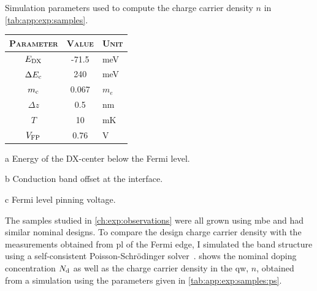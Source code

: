 \begin{margintable}
    \centering
    \footnotesize
    \begin{threeparttable}
        \caption{
            Simulation parameters used to compute the charge carrier density $n$ in \cref{tab:app:exp:samples}.
        }
        \label{tab:app:exp:samples:ps}
        \begin{tabularx}{\marginparwidth}{c S l}
            \toprule
            \textsc{Parameter}              & {\textsc{Value}}  & \textsc{Unit} \\
            \midrule
            $E_{\mathrm{DX}}$          & -71.5             & \unit{meV} \\
            $\Delta E_{\mathrm{c}}$    & 240               & \unit{meV} \\
            $m_{\mathrm{c}}$                    & 0.067             & $m_e$ \\
            $\Delta z$                      & 0.5               & \unit{nm} \\
            $T$                             & 10                & \unit{mK} \\
            $V_{\mathrm{FP}}$          & 0.76              & \unit{V} \\
            \bottomrule
        \end{tabularx}
        \begin{tablenotes}
            \scriptsize
            \item[a] Energy of the DX-center below the Fermi level.
            \item[b] Conduction band offset at the  interface.
            \item[c] Fermi level pinning voltage.
        \end{tablenotes}
    \end{threeparttable}
\end{margintable}

The samples studied in \cref{ch:exp:observations} were all grown using \gls{mbe} and had similar nominal designs.
To compare the design charge carrier density with the measurements obtained from \gls{pl} of the Fermi edge, I simulated the band structure using a self-consistent Poisson-Schrödinger solver~\cite{PoissonSchroedinger}.
 shows the nominal doping concentration $N_{\mathrm{d}}$ as well as the charge carrier density in the \gls{qw}, $n$, obtained from a simulation using the parameters given in \cref{tab:app:exp:samples:ps}.

